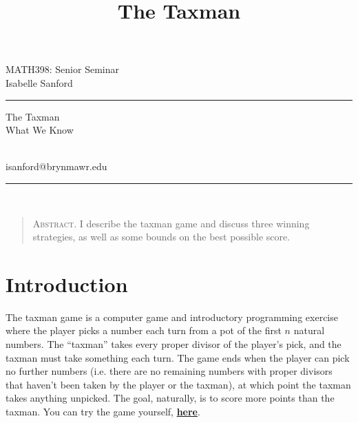 \documentclass[a4paper,10pt]{amsart} %
\begin{document}

\title{The Taxman} %
\fancyhead[C]{}
\begin{minipage}{0.295\textwidth} %
\raggedright
MATH398: Senior Seminar\\ %
\footnotesize %
Isabelle Sanford %
\medskip\hrule
\end{minipage}
\begin{minipage}{0.4\textwidth} %
\centering 
\large %
The Taxman\\ %
\normalsize %
What We Know \\ %
\end{minipage}
\begin{minipage}{0.295\textwidth} %
\raggedleft
{} \\%
\footnotesize %
isanford@brynmawr.edu%
\medskip\hrule
\end{minipage}\\


\begin{quote}
    \textsc{Abstract.} I describe the taxman game and discuss three winning strategies, as well as some bounds on the best possible score.
\end{quote}
 

\section{Introduction} \label{intro}

The taxman game is a computer game and introductory programming exercise where the player picks a number each turn from a pot of the first $n$ natural numbers. The ``taxman'' takes every proper divisor of the player's pick, and the taxman must take something each turn. The game ends when the player can pick no further numbers (i.e. there are no remaining numbers with proper divisors that haven't been taken by the player or the taxman), at which point the taxman takes anything unpicked. The goal, naturally, is to score more points than the taxman. You can try the game yourself, \textbf{\href{https://www.dsm.fordham.edu/~moniot/taxman.html}{here}}. 
\end{document}
